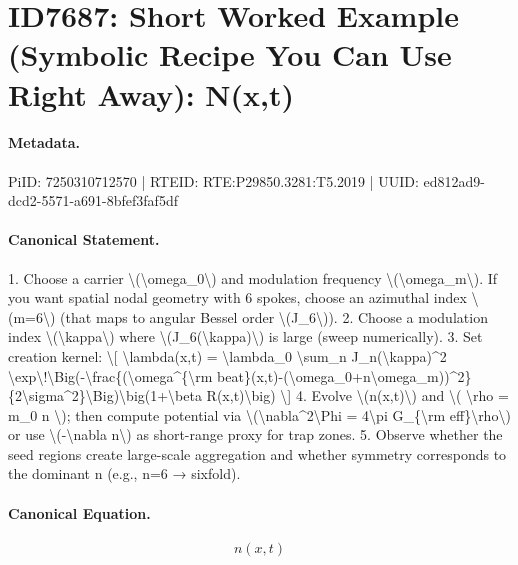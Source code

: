 \section*{ID7687: Short Worked Example (Symbolic Recipe You Can Use Right Away): N(x,t)}
\paragraph{Metadata.}
PiID: 7250310712570 | RTEID: RTE:P29850.3281:T5.2019 | UUID: ed812ad9-dcd2-5571-a691-8bfef3faf5df

\paragraph{Canonical Statement.}
1. Choose a carrier \textbackslash{}(\textbackslash{}omega\_0\textbackslash{}) and modulation frequency \textbackslash{}(\textbackslash{}omega\_m\textbackslash{}). If you want spatial nodal geometry with 6 spokes, choose an azimuthal index \textbackslash{}(m=6\textbackslash{}) (that maps to angular Bessel order \textbackslash{}(J\_6\textbackslash{})). 2. Choose a modulation index \textbackslash{}(\textbackslash{}kappa\textbackslash{}) where \textbackslash{}(J\_6(\textbackslash{}kappa)\textbackslash{}) is large (sweep numerically). 3. Set creation kernel: \textbackslash{}[ \textbackslash{}lambda(x,t) = \textbackslash{}lambda\_0 \textbackslash{}sum\_n J\_n(\textbackslash{}kappa)\textasciicircum{}2 \textbackslash{}exp\textbackslash{}!\textbackslash{}Big(-\textbackslash{}frac\{(\textbackslash{}omega\textasciicircum{}\{\textbackslash{}rm beat\}(x,t)-(\textbackslash{}omega\_0+n\textbackslash{}omega\_m))\textasciicircum{}2\}\{2\textbackslash{}sigma\textasciicircum{}2\}\textbackslash{}Big)\textbackslash{}big(1+\textbackslash{}beta R(x,t)\textbackslash{}big) \textbackslash{}] 4. Evolve \textbackslash{}(n(x,t)\textbackslash{}) and \textbackslash{}( \textbackslash{}rho = m\_0 n \textbackslash{}); then compute potential via \textbackslash{}(\textbackslash{}nabla\textasciicircum{}2\textbackslash{}Phi = 4\textbackslash{}pi G\_\{\textbackslash{}rm eff\}\textbackslash{}rho\textbackslash{}) or use \textbackslash{}(-\textbackslash{}nabla n\textbackslash{}) as short-range proxy for trap zones. 5. Observe whether the seed regions create large-scale aggregation and whether symmetry corresponds to the dominant n (e.g., n=6 → sixfold).

\paragraph{Canonical Equation.}
\[
n(x,t)
\]

